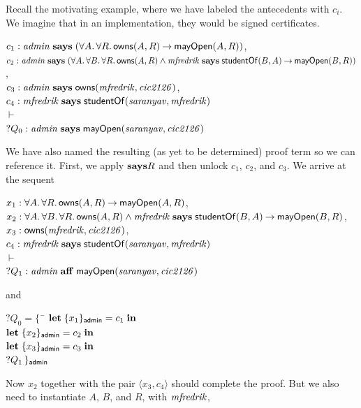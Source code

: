 \documentclass[11pt]{article}
\begin{document}
Recall the motivating example, where we have labeled the antecedents with $c_i$.
We imagine that in an implementation, they would be signed certificates.
\begin{tabbing}
  \quad $c_1 : \mathit{admin} \mathrel{\mathbf{says}} (\forall A.\, \forall R.\, \mathsf{owns}(A, R) \mathbin{\rightarrow} \mathsf{mayOpen}(A, R))$, \\
  \quad $c_2 : \mathit{admin} \mathrel{\mathbf{says}} (\forall A.\, \forall B.\, \forall R.\, \mathsf{owns}(A, R)
  \land \mathit{mfredrik} \mathrel{\mathbf{says}} \mathsf{studentOf}(B, A) \mathbin{\rightarrow} \mathsf{mayOpen}(B, R))$, \\[1ex]
  \quad $c_3 : \mathit{admin} \mathrel{\mathbf{says}} \mathsf{owns}(\mathit{mfredrik}, \mathit{cic2126})$, \\
  \quad $c_4 : \mathit{mfredrik} \mathrel{\mathbf{says}} \mathsf{studentOf}(\mathit{saranyav}, \mathit{mfredrik})$ \\[1ex]
  \quad $\vdash$ \\[1ex]
  \quad ${?}Q_0 : \mathit{admin} \mathrel{\mathbf{says}} \mathsf{mayOpen}(\mathit{saranyav}, \mathit{cic2126})$
\end{tabbing}
We have also named the resulting (as yet to be determined) proof term so we can
reference it.  First, we apply $\mathbf{says}R$ and then unlock $c_1$, $c_2$, and $c_3$.
We arrive at the sequent
\begin{tabbing}
  \quad $x_1 : \forall A.\, \forall R.\, \mathsf{owns}(A, R) \mathbin{\rightarrow} \mathsf{mayOpen}(A, R)$, \\
  \quad $x_2 : \forall A.\, \forall B.\, \forall R.\, \mathsf{owns}(A, R)
  \land \mathit{mfredrik} \mathrel{\mathbf{says}} \mathsf{studentOf}(B, A) \mathbin{\rightarrow} \mathsf{mayOpen}(B, R)$, \\[1ex]
  \quad $x_3 : \mathsf{owns}(\mathit{mfredrik}, \mathit{cic2126})$, \\
  \quad $c_4 : \mathit{mfredrik} \mathrel{\mathbf{says}} \mathsf{studentOf}(\mathit{saranyav}, \mathit{mfredrik})$ \\[1ex]
  \quad $\vdash$ \\[1ex]
  \quad ${?}Q_1 : \mathit{admin} \mathrel{\mathbf{aff}} \mathsf{mayOpen}(\mathit{saranyav}, \mathit{cic2126})$
\end{tabbing}
and
\begin{tabbing}
  \qquad ${?}Q_0 = \{\,$ \= $\mathbf{let}\; \{x_1\}_{\mathsf{admin}} = c_1\; \mathbf{in}$ \\
  \> $\mathbf{let}\; \{x_2\}_{\mathsf{admin}} = c_2\; \mathbf{in}$ \\
  \> $\mathbf{let}\; \{x_3\}_{\mathsf{admin}} = c_3\; \mathbf{in}$ \\
  \> ${?}Q_1\, \}_{\mathsf{admin}}$
\end{tabbing}
Now $x_2$ together with the pair $\langle x_3, c_4\rangle$ should complete the
proof.  But we also need to instantiate $A$, $B$, and $R$, with $\mathit{mfredrik}$,
\end{document}
